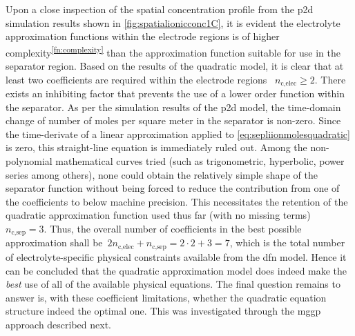Upon a close inspection of the  spatial concentration profile from the \gls{p2d}
simulation  results shown  in \cref{fig:spatialionicconc1C},  it is  evident the
electrolyte approximation  functions within the  electrode regions is  of higher
complexity\textsuperscript{\ref{fn:complexity}} than  the approximation function
suitable  for  use  in  the  separator  region. Based  on  the  results  of  the
quadratic  model, it  is  clear  that at  least  two  coefficients are  required
within the  electrode regions \ie~${n_{\text{c,elec}}  \ge 2}$. There  exists an
inhibiting  factor that  prevents  the  use of  a  lower  order function  within
the  separator. As  per  the  simulation results  of  the  \gls{p2d} model,  the
time-domain  change  of number  of  moles  per  square  meter in  the  separator
is  non-zero.  Since  the  time-derivate   of  a  linear  approximation  applied
to  \cref{eq:sepliionmolesquadratic} is  zero,  this  straight-line equation  is
immediately ruled out. Among the  non-polynomial mathematical curves tried (such
as trigonometric, hyperbolic, power series  among others), none could obtain the
relatively simple shape of the separator function without being forced to reduce
the  contribution from  one  of  the coefficients  to  below machine  precision.
This necessitates  the retention  of the  quadratic approximation  function used
thus  far  (with  no  missing  terms)  \ie~${n_\text{c,sep}  =  3}$.  Thus,  the
overall number of  coefficients in the best possible  approximation shall be~${2
n_\text{c,elec} + n_\text{c,sep} = 2\cdot2 + 3  = 7}$, which is the total number
of electrolyte-specific physical constraints available from the \gls{dfn} model.
Hence it  can be concluded  that the  quadratic approximation model  does indeed
make the \emph{best}  use of all of the available  physical equations. The final
question remains to  answer is, with these coefficient  limitations, whether the
quadratic  equation structure  indeed  the optimal  one.  This was  investigated
through the \gls{mggp} approach described next.

